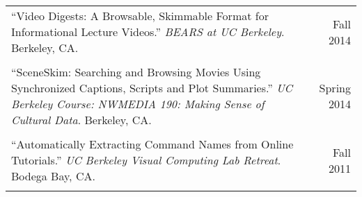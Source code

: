 \begin{longtable}{Xr}
	``Video Digests: A Browsable, Skimmable Format for Informational Lecture Videos.'' \textit{BEARS at UC Berkeley}. Berkeley, CA. & Fall 2014 \\
	\\

	``SceneSkim: Searching and Browsing Movies Using Synchronized Captions, Scripts and Plot Summaries.'' \textit{UC Berkeley Course: NWMEDIA 190: Making Sense of Cultural Data}. Berkeley, CA. & Spring 2014 \\
	\\

	``Automatically Extracting Command Names from Online Tutorials.'' \textit{UC Berkeley Visual Computing Lab Retreat}. Bodega Bay, CA. & Fall 2011 \\
	\\

\end{longtable}
